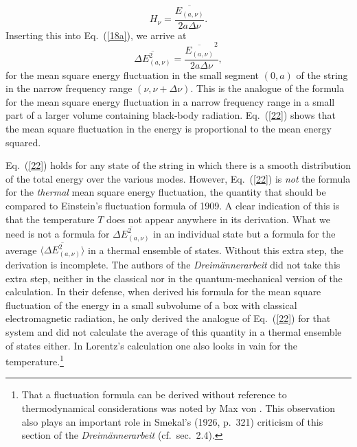\documentclass{elsart}
\begin{document}
\begin{equation}
H_\nu = \frac{\overline{ E_{(a, \nu)} }}{2 a \Delta \nu}.
\label{21}
\end{equation}
Inserting this into Eq.\ (\ref{18a}), we arrive at
\begin{equation}
\overline{ \Delta E_{(a, \nu)}^2 } = 
\frac{ \overline{E_{(a, \nu)} }^2 }{2a \Delta \nu},
\label{22}
\end{equation}
for the mean square energy fluctuation in the small segment $(0, a)$ of the string  in the narrow frequency range $(\nu, \nu + \Delta \nu)$. This is the analogue of the formula for the mean square energy fluctuation in a narrow frequency range in a small part of a larger volume containing black-body radiation.  Eq.\ (\ref{22}) shows that the mean square fluctuation in the energy is proportional to the mean energy squared. 

Eq.\ (\ref{22}) holds for any state of the string in which there is a smooth distribution of the total energy over the various modes. However, Eq.\ (\ref{22}) is {\it not} the formula for the {\it thermal} mean square energy fluctuation, the quantity that should be compared to Einstein's fluctuation formula of 1909. A clear indication of this is that the temperature $T$ does not appear anywhere in its derivation. What we need is not a formula for $\overline{ \Delta E_{(a, \nu)}^2 }$ in an individual state but a formula for the average $\langle \overline{ \Delta E_{(a, \nu)}^2 } \rangle$ in a thermal ensemble of states. Without this extra step, the derivation is incomplete. The authors of the {\it Dreim\"annerarbeit} did not take this extra step, neither in the classical nor in the quantum-mechanical version of the calculation. In their defense, when \citet{Lorentz 1916}  derived his formula for the mean square fluctuation of the energy in a small subvolume of a box with classical electromagnetic radiation, he only derived the  analogue of Eq.\ (\ref{22}) for that system and did not calculate the average of this quantity in a thermal ensemble of states either. In Lorentz's calculation one also looks in vain for the temperature.\footnote{That a fluctuation formula can be derived without reference to thermodynamical considerations was noted by Max von \citet[p.\ 199]{Laue 1915c} \citep[p.\ 199]{Bach 1989}. This observation also plays an important role in Smekal's (1926, p.\ 321) criticism of this section of the {\it Dreim\"annerarbeit} (cf.\ sec.\ 2.4).}
\end{document}
